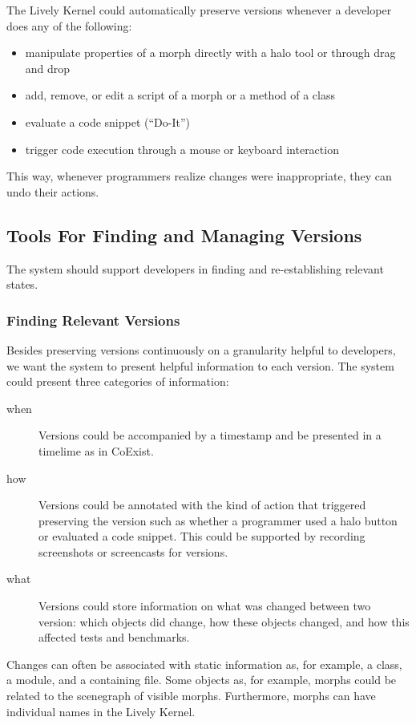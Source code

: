 The Lively Kernel could automatically preserve versions whenever a developer does any of the following:
\begin{itemize}
    \item manipulate properties of a morph directly with a halo tool or through drag and drop
    \item add, remove, or edit a script of a morph or a method of a class
    \item evaluate a code snippet (``Do-It'')
    \item trigger code execution through a mouse or keyboard interaction
\end{itemize}

This way, whenever programmers realize changes were inappropriate, they can undo their actions.

\subsection{Tools For Finding and Managing Versions}

The system should support developers in finding and re-establishing relevant states.

\subsubsection{Finding Relevant Versions}

Besides preserving versions continuously on a granularity helpful to developers, we want the system to present helpful information to each version.
The system could present three categories of information:

\begin{description}
    \item[when] Versions could be accompanied by a timestamp and be presented in a timelime as in CoExist.
    \item[how] Versions could be annotated with the kind of action that triggered preserving the version such as whether a programmer used a halo button or evaluated a code snippet. This could be supported by recording screenshots or screencasts for versions.
    \item[what] Versions could store information on what was changed between two version: which objects did change, how these objects changed, and how this affected tests and benchmarks.
\end{description}

Changes can often be associated with static information as, for example, a class, a module, and a containing file.
Some objects as, for example, morphs could be related to the scenegraph of visible morphs.
Furthermore, morphs can have individual names in the Lively Kernel.

